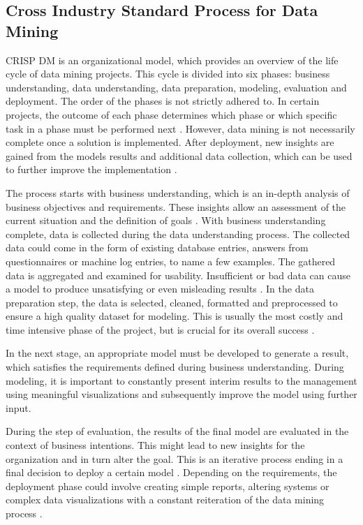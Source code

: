 \subsection{Cross Industry Standard Process for Data Mining}

\ac{CRISP DM} is an organizational model, which provides
an overview of the life cycle of data mining projects.
This cycle is divided into six phases: business understanding,
data understanding, data preparation, modeling, evaluation and deployment. 
The order of the phases is not strictly adhered to. In certain projects,
the outcome of each phase determines which phase or which specific task in a phase must be performed next \cite[p. 528]{Schroer2021}.
However, data mining is not necessarily complete once a solution is implemented. 
After deployment, new insights are gained from the models results and additional data collection,
which can be used to further improve the implementation \cite[p. 529]{Schroer2021}.

The process starts with business understanding, which is an in-depth analysis of business objectives and requirements.
These insights allow an assessment of the current situation and the definition of goals \cite[]{Lopez2021}.
With business understanding complete, data is collected during the data understanding process.
The collected data could come in the form of existing database entries, answers from questionnaires or machine log entries, to name a few examples.
The gathered data is aggregated and examined for usability.
Insufficient or bad data can cause a model to produce unsatisfying or even misleading results \cite[]{Miner2017}.
In the data preparation step, the data is selected, cleaned, formatted and preprocessed to ensure
a high quality dataset for modeling. This is usually the most costly and time intensive phase of the project,
but is crucial for its overall success \cite[]{Miner2017}.

In the next stage, an appropriate model must be developed to generate a result,
which satisfies the requirements defined during business understanding.
During modeling, it is important to constantly present interim results to the management using meaningful visualizations
and subsequently improve the model using further input.

During the step of evaluation, the results of the final model are evaluated in the context of business intentions. 
This might lead to new insights for the organization and in turn alter the goal.
This is an iterative process ending in a final decision to deploy a certain model \cite[p. 530]{Schroer2021}.
Depending on the requirements, the deployment phase could involve creating simple reports,
altering systems or complex data visualizations with a constant reiteration of the data mining process \cite[p. 532]{Schroer2021}.